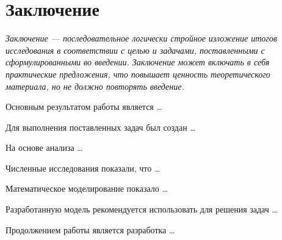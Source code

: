 \begingroup
  \let\clearpage\relax                        %
  \par\vspace{3ex}                            %
  \chapter*{Заключение}                       %
\endgroup


\textit{Заключение --- последовательное логически стройное изложение итогов исследования в соответствии с целью и задачами, поставленными с сформулированными во введении.
Заключение может включать в себя практические предложения, что повышает ценность теоретического материала, но не должно повторять введение.}
\bigskip

Основным результатом работы является \dots

Для выполнения поставленных задач был создан \dots

На основе анализа \dots

Численные исследования показали, что \dots

Математическое моделирование показало \dots

Разработанную модель рекомендуется использовать для решения задач \dots

Продолжением работы является разработка \dots
